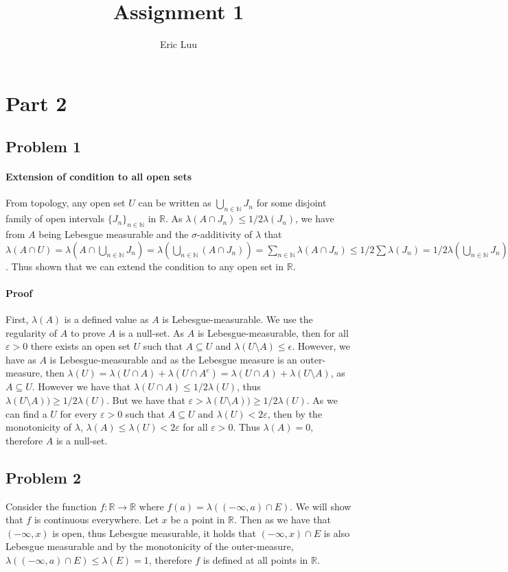 \documentclass{article}
\title{Assignment 1}
\author{Eric Luu}
\theoremstyle{definition}
\numberwithin{theorem}{section}
\numberwithin{equation}{section}
\begin{document}
\maketitle
\section{Part 2}
\subsection{Problem 1}
\paragraph{Extension of condition to all open sets}
From topology, any open set $U$ can be written as $\bigcup_{n \in \mathbb{N}} J_n$ for some disjoint family of open intervals $\lbrace J_n \rbrace_{n \in \mathbb{N}}$ in $\mathbb{R}$. As $\lambda(A \cap J_n) \leq 1/2 \lambda(J_n)$, we have from $A$ being Lebesgue measurable and the $\sigma$-additivity of $\lambda$ that $ \lambda(A \cap U) = \lambda(A \cap \bigcup_{n \in \mathbb{N}} J_n)= \lambda(\bigcup_{n \in \mathbb{N}} (A \cap J_n)) =\sum_{n \in \mathbb{N}} \lambda(A \cap J_n) \leq 1/2 \sum \lambda(J_n) = 1/2 \lambda(\bigcup_{n \in \mathbb{N}} J_n) = 1/2 \lambda(U)$. Thus shown that we can extend the condition to any open set in $\mathbb{R}$. 
\paragraph{Proof}
First, $\lambda(A)$ is a defined value as $A$ is Lebesgue-measurable. We use the regularity of $A$ to prove $A$ is a null-set. As $A$ is Lebesgue-measurable, then for all $\varepsilon > 0$ there exists an open set $U$ such that $A \subseteq U$ and $\lambda(U\setminus A) \leq \epsilon$. However, we have as $A$ is Lebesgue-measurable and as the Lebesgue measure is an outer-measure, then $\lambda(U) = \lambda(U \cap A) + \lambda(U \cap A^c) = \lambda(U \cap A) + \lambda(U \setminus A)$, as $A \subseteq U$. However we have that $\lambda(U \cap A) \leq 1/2 \lambda(U)$, thus $\lambda(U \setminus A)) \geq 1/2 \lambda(U)$. But we have that $\varepsilon> \lambda(U \setminus A)) \geq 1/2 \lambda(U)$. As we can find a $U$ for every $\varepsilon> 0$ such that $A \subseteq U$ and $\lambda(U) < 2 \varepsilon$, then by the monotonicity of $\lambda$, $\lambda(A) \leq \lambda(U) < 2 \varepsilon$ for all $\varepsilon > 0$. Thus $\lambda(A) = 0$, therefore $A$ is a null-set.  
\subsection{Problem 2}
Consider the function $f: \mathbb{R} \rightarrow \mathbb{R}$ where $f(a) = \lambda((-\infty, a) \cap E)$. We will show that $f$ is continuous everywhere. Let $x$ be a point in $\mathbb{R}$. Then as we have that $(-\infty, x)$ is open, thus Lebesgue measurable, it holds that $(-\infty, x) \cap E$ is also Lebesgue measurable and by the monotonicity of the outer-measure, $\lambda((-\infty, a) \cap E) \leq \lambda(E) = 1$, therefore $f$ is defined at all points in $\mathbb{R}$. 
\end{document}
